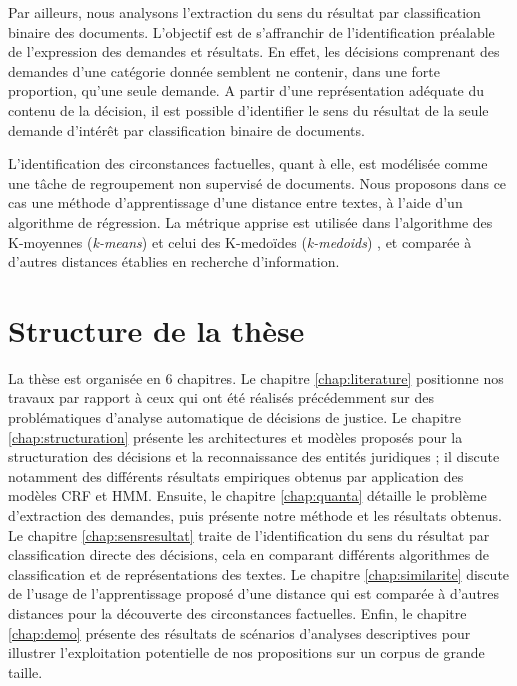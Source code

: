 Par ailleurs, nous analysons l'extraction du sens du résultat par classification binaire des documents. L'objectif est de s'affranchir de l'identification préalable de l'expression des demandes et résultats. En effet, les décisions comprenant des demandes d'une catégorie donnée semblent ne contenir, dans une forte proportion, qu'une seule demande. %
A partir d'une représentation adéquate du contenu de la décision, il est possible d'identifier le sens du résultat de la seule demande d'intérêt par classification binaire de documents.

L'identification des circonstances factuelles, quant à elle, est modélisée comme une tâche de regroupement non supervisé de documents. Nous proposons dans ce cas une méthode d'apprentissage d'une distance entre textes, à l'aide d'un algorithme de régression. La métrique apprise est utilisée dans l'algorithme des \og K-moyennes \fg{} (\textit{k-means}) \citep{forgey1965kmeans} et celui des \og K-medoïdes \fg{} (\textit{k-medoids}) \citep{kaufman1987kmedoids}, et comparée à d'autres distances établies en recherche d'information.

\section{Structure de la thèse}
\label{sec:intro:organisation}

La thèse est organisée en 6 chapitres. Le chapitre \ref{chap:literature} positionne nos travaux par rapport à ceux qui ont été réalisés précédemment sur des problématiques d'analyse automatique de décisions de justice. Le chapitre \ref{chap:structuration} présente les architectures et modèles proposés pour la structuration des décisions et la reconnaissance des entités juridiques ; il discute notamment des différents résultats empiriques obtenus par application des modèles CRF et HMM. Ensuite, le chapitre \ref{chap:quanta} détaille le problème  d'extraction des demandes, puis présente notre méthode et les résultats obtenus. Le chapitre \ref{chap:sensresultat} traite de l'identification du sens du résultat par classification directe des décisions, cela en comparant différents algorithmes de classification et de représentations des textes. Le chapitre \ref{chap:similarite} discute de l'usage de l'apprentissage proposé d'une distance qui est comparée à d'autres distances pour la découverte des circonstances factuelles. Enfin, le chapitre \ref{chap:demo} présente des résultats de scénarios d'analyses descriptives pour illustrer l'exploitation potentielle de nos propositions sur un corpus de grande taille. 
